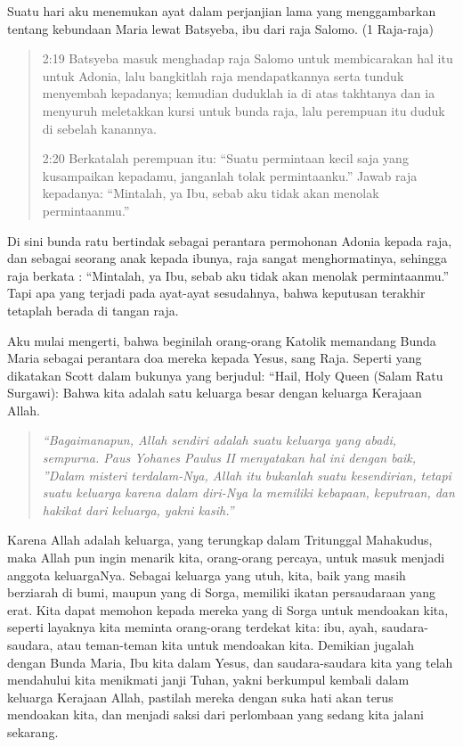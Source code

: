 Suatu hari aku menemukan ayat dalam perjanjian lama yang menggambarkan tentang kebundaan Maria lewat Batsyeba, ibu dari raja Salomo. (1 Raja-raja) 

\begin{quote}
2:19 Batsyeba masuk menghadap raja Salomo untuk membicarakan hal itu untuk Adonia, lalu bangkitlah raja mendapatkannya serta tunduk menyembah kepadanya; kemudian duduklah ia di atas takhtanya dan ia menyuruh meletakkan kursi untuk bunda raja, lalu perempuan itu duduk di sebelah kanannya.

2:20 Berkatalah perempuan itu: “Suatu permintaan kecil saja yang kusampaikan kepadamu, janganlah tolak permintaanku.” Jawab raja kepadanya: “Mintalah, ya Ibu, sebab aku tidak akan menolak permintaanmu.”
\end{quote}

Di sini bunda ratu bertindak sebagai perantara permohonan Adonia kepada raja, dan sebagai seorang anak kepada ibunya, raja sangat menghormatinya, sehingga raja berkata : “Mintalah, ya Ibu, sebab aku tidak akan menolak permintaanmu.” Tapi apa yang terjadi pada ayat-ayat sesudahnya, bahwa keputusan terakhir tetaplah berada di tangan raja.

Aku mulai mengerti, bahwa beginilah orang-orang Katolik memandang Bunda Maria sebagai perantara doa mereka kepada Yesus, sang Raja.
Seperti yang dikatakan Scott dalam bukunya yang berjudul: “Hail, Holy Queen (Salam Ratu Surgawi): Bahwa kita adalah satu keluarga besar dengan keluarga Kerajaan Allah.

\begin{quote}\emph{
“Bagaimanapun, Allah sendiri adalah suatu keluarga yang abadi, sempurna. Paus Yohanes Paulus II menyatakan hal ini dengan baik, ”Dalam misteri terdalam-Nya, Allah itu bukanlah suatu kesendirian, tetapi suatu keluarga karena dalam diri-Nya la memiliki kebapaan, keputraan, dan hakikat dari keluarga, yakni kasih.”}
\end{quote}

Karena Allah adalah keluarga, yang terungkap dalam Tritunggal Mahakudus, maka Allah pun ingin menarik kita, orang-orang percaya, untuk masuk menjadi anggota keluargaNya. Sebagai keluarga yang utuh, kita, baik yang masih berziarah di bumi, maupun yang di Sorga, memiliki ikatan persaudaraan yang erat. Kita dapat memohon kepada mereka yang di Sorga untuk mendoakan kita, seperti layaknya kita meminta orang-orang terdekat kita: ibu, ayah, saudara-saudara, atau teman-teman kita untuk mendoakan kita. Demikian jugalah dengan Bunda Maria, Ibu kita dalam Yesus, dan saudara-saudara kita yang telah mendahului kita menikmati janji Tuhan, yakni berkumpul kembali dalam keluarga Kerajaan Allah, pastilah mereka dengan suka hati akan terus mendoakan kita, dan menjadi saksi dari perlombaan yang sedang kita jalani sekarang.

